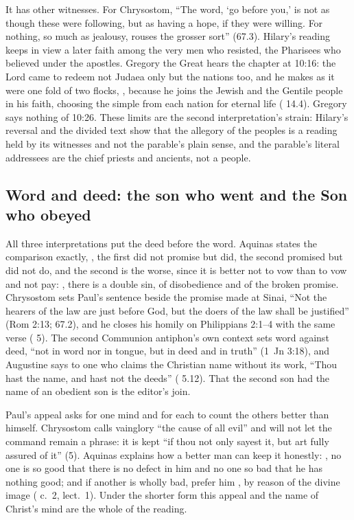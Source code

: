It has other witnesses. For Chrysostom, ``The word, `go before you,' is not as
though these were following, but as having a hope, if they were willing. For
nothing, so much as jealousy, rouses the grosser sort'' (67.3). Hilary's
reading keeps in view a later faith among the very men who resisted, the
Pharisees who believed under the apostles. Gregory the Great hears the chapter
at 10:16: the Lord came to redeem not Judaea only but the nations too, and he
makes as it were one fold of two flocks, , because he joins the Jewish and the Gentile
people in his faith, choosing the simple from each nation for eternal life
( 14.4). Gregory says nothing of 10:26. These
limits are the second interpretation's strain: Hilary's reversal and the
divided text show that the allegory of the peoples is a reading held by its
witnesses and not the parable's plain sense, and the parable's literal
addressees are the chief priests and ancients, not a people.

\subsection{Word and deed: the son who went and the Son who obeyed}

All three interpretations put the deed before the word. Aquinas states the
comparison exactly, , the first did not promise but did, the second promised but did
not do, and the second is the worse, since it is better not to vow than
to vow and not pay: , there is a double sin, of disobedience
and of the broken promise. Chrysostom sets Paul's sentence beside the promise
made at Sinai, ``Not the hearers of the law are just before God, but the doers of
the law shall be justified'' (Rom 2:13;  67.2), and he
closes his homily on Philippians 2:1--4 with the same verse ( 5). The second Communion antiphon's own context sets word against
deed, ``not in word nor in tongue, but in deed and in truth'' (1~Jn 3:18), and
Augustine says to one who claims the Christian name without its work, ``Thou
hast the name, and hast not the deeds'' ( 5.12). That the second son had the name of an obedient son is the
editor's join.

Paul's appeal asks for one mind and for each to count the others better than
himself. Chrysostom calls vainglory ``the cause of all evil'' and will not let
the command remain a phrase: it is kept ``if thou not only sayest it, but art
fully assured of it'' (5). Aquinas explains how a better man can keep it
honestly: , no one is so good that there
is no defect in him and no one so bad that he has nothing good; and if another
is wholly bad, prefer him , by reason of the
divine image ( c.~2, lect.~1). Under the shorter form
this appeal and the name of Christ's mind are the whole of the reading.

